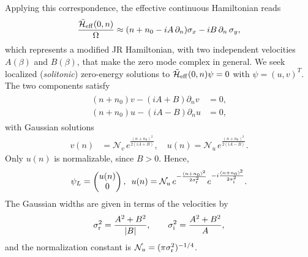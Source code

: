 \documentclass[prl,twocolumn,floatfix,10pt,superscriptaddress]{revtex4-2}
\newcommand{\mcl}[1]{\mathcal{#1}}
\begin{document}
Applying this correspondence, the effective continuous Hamiltonian reads
\begin{align}
\frac{\tilde{\mcl{H}}_{\rm eff}(0,n)}{\Omega}\approx(n + n_0 -iA\,\partial_n)\sigma_x
-iB\,\partial_n\,\sigma_y,
\end{align}
which represents a modified JR Hamiltonian, with two independent velocities $A(\beta)$ and $B(\beta)$, that make the zero mode complex in general. We seek localized (\emph{solitonic}) zero-energy solutions to 
$\tilde{\mcl{H}}_{\rm eff}(0,n) \psi=0$ with $\psi=(u,v)^{\!T}$. The two components satisfy
\begin{align}\label{eq:u_v_right}
\begin{aligned}
(n+n_0) v-(iA+B)\partial_n v&=0,\\
(n+n_0) u-(iA-B)\partial_n u&=0,
\end{aligned}
\end{align}
with Gaussian solutions
\begin{align}
v(n)&=\mcl{N}_v\,e^{\frac{(n+n_0)^2}{2(iA+B)}},\quad
u(n)=\mcl{N}_u\,e^{\frac{(n+n_0)^2}{2(iA-B)}}.
\end{align}
Only $u(n)$ is normalizable, since $B > 0$. Hence,
\begin{align}
\begin{aligned}
\psi_L =
\begin{pmatrix} u(n) \\ 0 \end{pmatrix},
\,\,\,
u(n)=\mcl{N}_u \,e^{-\frac{(n+n_0)^2}{2\sigma_{\rm r}^2}}
      e^{-i\frac{(n + n_0)^2}{2\sigma_{\rm i}^2}}. %
\end{aligned}
\end{align}
The Gaussian widths are given in terms of the velocities by
\begin{equation}
\sigma_{\rm r}^2=\frac{A^2+B^2}{|B|}, \qquad
\sigma_{\rm i}^2=\frac{A^2+B^2}{A},
\end{equation}
and the normalization constant is $\mcl{N}_u=(\pi\sigma_{\rm r}^2)^{-1/4}$.
\end{document}
